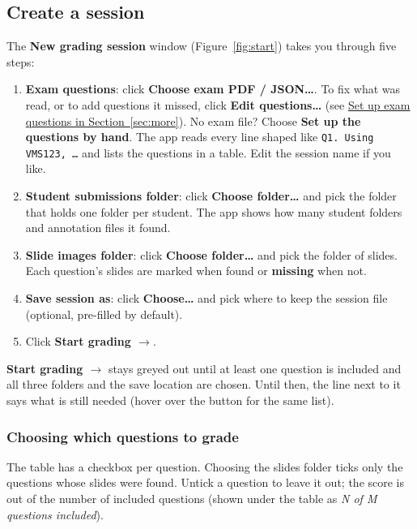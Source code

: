 \subsection{Create a session}\label{sec:getting-started:create-a-session}

The \textbf{New grading session} window (Figure~\ref{fig:start}) takes you through five steps:

\begin{enumerate}[topsep=2pt, itemsep=2pt]
\item \textbf{Exam questions}: click \textbf{Choose exam PDF / JSON\ldots{}}. To fix what was read, or to add questions it missed, click \textbf{Edit questions\ldots{}} (see \href{https://github.com/agadin/micro-speed-grader/blob/main/docs/help/exam-questions.md}{Set up exam questions in Section~\ref{sec:more}}). No exam file? Choose \textbf{Set up the questions by hand}. The app reads every line shaped like \texttt{Q1. Using VMS123, \ldots{}} and lists the questions in a table. Edit the session name if you like.
\item \textbf{Student submissions folder}: click \textbf{Choose folder\ldots{}} and pick the folder that holds one folder per student. The app shows how many student folders and annotation files it found.
\item \textbf{Slide images folder}: click \textbf{Choose folder\ldots{}} and pick the folder of slides. Each question's slides are marked \textbf{\checksym{}} when found or \textbf{missing} when not.
\item \textbf{Save session as}: click \textbf{Choose\ldots{}} and pick where to keep the session file (optional, pre-filled by default).
\item Click \textbf{Start grading \ensuremath{\rightarrow}}.
\end{enumerate}

\textbf{Start grading \ensuremath{\rightarrow}} stays greyed out until at least one question is included and all three folders and the save location are chosen. Until then, the line next to it says what is still needed (hover over the button for the same list).

\subsubsection{Choosing which questions to grade}\label{sec:getting-started:choosing-which-questions-to-grade}

The table has a checkbox per question. Choosing the slides folder ticks only the questions whose slides were found. Untick a question to leave it out; the score is out of the number of included questions (shown under the table as \emph{N of M questions included}).


